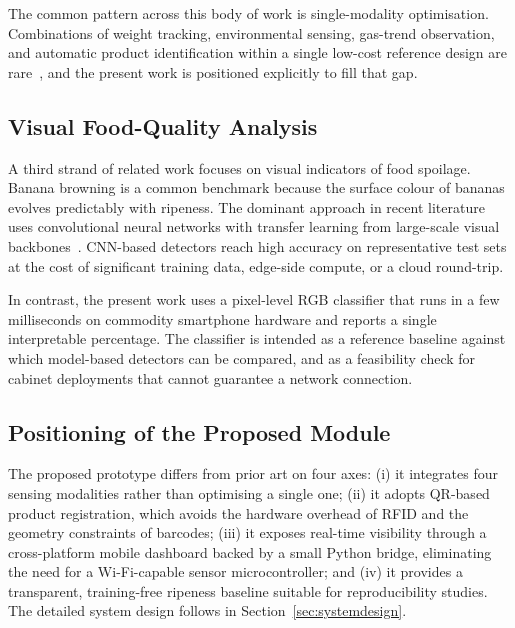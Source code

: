 The common pattern across this body of work is single-modality
optimisation. Combinations of weight tracking, environmental sensing,
gas-trend observation, and automatic product identification within a
single low-cost reference design are
rare~\cite{sarawathi2025spoilage}, and the present work is positioned
explicitly to fill that gap.

\subsection{Visual Food-Quality Analysis}

A third strand of related work focuses on visual indicators of food
spoilage. Banana browning is a common benchmark because the surface
colour of bananas evolves predictably with ripeness. The dominant
approach in recent literature uses convolutional neural networks with
transfer learning from large-scale visual
backbones~\cite{vadlamudi2025fridgesense}. CNN-based detectors reach
high accuracy on representative test sets at the cost of significant
training data, edge-side compute, or a cloud round-trip.

In contrast, the present work uses a pixel-level RGB classifier that
runs in a few milliseconds on commodity smartphone hardware and
reports a single interpretable percentage. The classifier is intended
as a reference baseline against which model-based detectors can be
compared, and as a feasibility check for cabinet deployments that
cannot guarantee a network connection.

\subsection{Positioning of the Proposed Module}

The proposed prototype differs from prior art on four axes:
(i) it integrates four sensing modalities rather than optimising a
single one;
(ii) it adopts QR-based product registration, which avoids the
hardware overhead of RFID and the geometry constraints of barcodes;
(iii) it exposes real-time visibility through a cross-platform mobile
dashboard backed by a small Python bridge, eliminating the need for a
Wi-Fi-capable sensor microcontroller; and
(iv) it provides a transparent, training-free ripeness baseline
suitable for reproducibility studies. The detailed system design
follows in Section~\ref{sec:systemdesign}.
